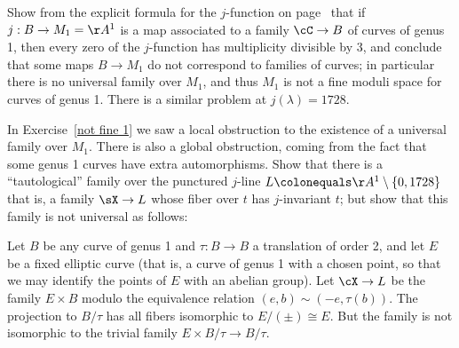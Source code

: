 \begin{exercise}\label{not fine 1}
Show from the explicit formula for the
%
$j$-function
on page~\pageref{formula for j}
that if $j : B \to M_1 = \AA^1$ is a
map  associated to a family $\cC \to B$ of curves of genus 1, then
every zero of the $j$-function has multiplicity divisible by 3, and
conclude that some maps $B\to M_1$ do not correspond to families of
curves; in particular there is no universal family over $M_1$, and
thus $M_1$ is not a fine moduli space for curves
of genus 1. There is a similar problem at $j(\lambda)=1728$.
\end{exercise}

\begin{exercise}\label{not fine 2}
In Exercise~\ref{not fine 1} we saw a local obstruction to the
%
existence of a universal family over $M_1$. There is also a global
obstruction, coming from the fact that some genus 1 curves have extra
automorphisms. Show that there is a ``tautological'' family over the
punctured $j$-line $L \colonequals  \AA^1\setminus \{0,1728\}$\emdash
that is, a family
$\sX \to L$ whose fiber over $t$ has $j$-invariant $t$; but show that this family is not universal as follows:

Let $B$ be any curve of genus 1 and $\tau : B \to B$ a translation of
order 2, and let $E$ be a fixed
elliptic curve
%
(that is, a curve of
genus 1 with a chosen point, so that we may identify the points of $E$
with an abelian group).
Let $\cX\to L$ be the family $E\times B$ modulo the equivalence
relation $(e,b) \sim (-e, \tau(b))$.
The projection to $B/\tau$ has all fibers isomorphic to $E/(\pm) \cong E$. But the family is not
isomorphic to the trivial family $E\times B/\tau \to B/\tau$.
\end{exercise}

